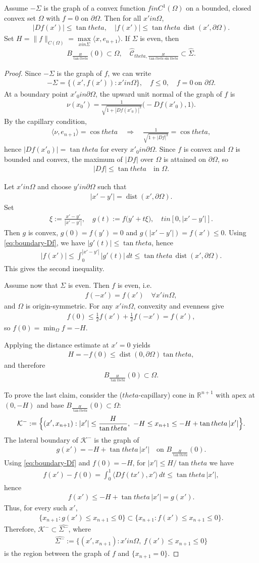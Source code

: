 \documentclass[12pt]{amsart}
\def\theta{theta}%
\def\in{in }%
\numberwithin{equation}{section}
\newcommand{\wh}{\widehat}
\newcommand{\bbR}{\mathbb{R}}
\newcommand{\8}{\infty}
\newcommand{\Si}{\Sigma}
\newcommand{\Om}{\Omega}
\newcommand{\cC}{\mathcal{C}}
\newcommand{\cK}{\mathcal{K}}
\DeclareMathOperator{\dist}{dist}
\newcommand{\fa}{\forall}
\newcommand{\eq}[1]{\begin{equation}\begin{alignedat}{2}#1\end{alignedat}\end{equation}}
\begin{document}
\begin{thm}\label{thm:grad-bound} Assume $-\Si$ is the graph of a convex function $f\in C^1(\Omega)$ on a bounded, closed convex set $\Omega$ with $f=0$ on $\partial\Om$.  Then for all $x'\in \Om$,
\eq{
|Df(x')|\le \tan\theta, \quad |f(x')|\le \tan\theta\,\dist(x',\partial\Om).
}
 Set $H=\|f\|_{C(\Omega)}=\max\limits_{x\in \Si}\langle x,e_{n+1}\rangle$. If $\Sigma$ is even, then 
 \eq{
 B_{\frac{H}{\tan\theta}}(0)\subset \Om,\quad\widehat{\cC}_{\theta,\frac{H}{\tan\theta\sin\theta}}\subset \wh{\Si}.
 }
\end{thm}
\begin{proof}
Since $-\Si$ is the graph of $f$, we can write
\eq{
  -\Si = \{(x',f(x')):x'\in \Om\},\quad f\le 0,\quad f=0\ \text{on }\partial\Om.
}
At a boundary point $x'_0\in\partial\Om$, the upward unit normal of the graph of $f$ is
\eq{
  \nu (x_0')= \frac{1}{\sqrt{1+|Df(x'_0)|^2}}\bigl(-Df(x'_0),1\bigr).
}
By the capillary condition,
\eq{
 \langle\nu,e_{n+1}\rangle = \cos\theta
  \quad\Longrightarrow\quad
  \frac{1}{\sqrt{1+|Df|^2}}=\cos\theta,
}
hence $|Df(x'_0)|=\tan\theta$ for every $x'_0\in\partial\Om$. Since $f$ is convex and $\Omega$ is bounded and convex, the maximum of $|Df|$ over $\Om$ is attained on $\partial\Om$, so
\eq{\label{eq:boundary-Df}
  |Df|\le \tan\theta \quad\text{in }\Om.
}

Let $x'\in\Om$ and choose $y'\in\partial\Om$ such that
\eq{
  |x'-y'| = \dist(x',\partial\Om).
}
Set
\eq{
  \xi := \frac{x'-y'}{|x'-y'|},\quad
  g(t) := f\bigl(y'+t\xi\bigr),\quad t\in[0,|x'-y'|].
}
Then $g$ is convex, $g(0)=f(y')=0$ and $g(|x'-y'|)=f(x')\le 0$. Using
\eqref{eq:boundary-Df}, we have $|g'(t)|\le\tan\theta$, hence
\eq{
  |f(x')|
   \le \int_0^{|x'-y'|} |g'(t)|\,dt
   \le \tan\theta\,\dist(x',\partial\Om).
}
This gives the second inequality.

Assume now that $\Si$ is even. Then $f$ is even, i.e.
\eq{
  f(-x') = f(x')\quad\fa x'\in\Om,
}
and $\Om$ is origin-symmetric. For any $x'\in\Om$, convexity and evenness give
\eq{
  f(0)
  \le \tfrac12 f(x') + \tfrac12 f(-x')
  = f(x'),
}
so $f(0)=\min_\Om f=-H$.

Applying the distance estimate at $x'=0$ yields
\eq{
  H = -f(0)\le \dist(0,\partial\Om)\tan\theta,
}
and therefore
\eq{
  B_{\frac{H}{\tan\theta}}(0)\subset\Om.
}

To prove the last claim, consider the ($\theta$-capillary) cone in $\bbR^{n+1}$ with apex at $(0,-H)$
and base $B_{\frac{H}{\tan\theta}}(0)\subset \Omega$:
\eq{
  \cK^-
  := \Bigl\{(x',x_{n+1}): |x'|\le \frac{H}{\tan\theta},\
     -H\le x_{n+1}\le -H+\tan\theta\,|x'|\Bigr\}.
}
The lateral boundary of $\cK^-$ is the graph of
\eq{
  g(x') = -H + \tan\theta\,|x'|
  \quad\text{on } B_{\frac{H}{\tan\theta}}(0).
}
Using \eqref{eq:boundary-Df} and $f(0)=-H$, for $|x'|\le H/\tan\theta$ we have
\eq{
  f(x') - f(0)
   = \int_0^1 \langle Df(tx'), x'\rangle\,dt
   \le \tan\theta\,|x'|,
}
hence
\eq{
  f(x') \le -H+\tan\theta\,|x'| = g(x').
}
Thus, for every such $x'$,
\eq{
  \{x_{n+1}: g(x')\le x_{n+1}\le 0\}
  \subset
  \{x_{n+1}: f(x')\le x_{n+1}\le 0\}.
}
Therefore, $\cK^-\subset\wh{\Si^-}$, where
\eq{
  \wh{\Si^-}
   := \{(x',x_{n+1}): x'\in\Om,\ f(x')\le x_{n+1}\le 0\}
}
is the region between the graph of $f$ and $\{x_{n+1}=0\}$. 


\end{proof}
\end{document}
